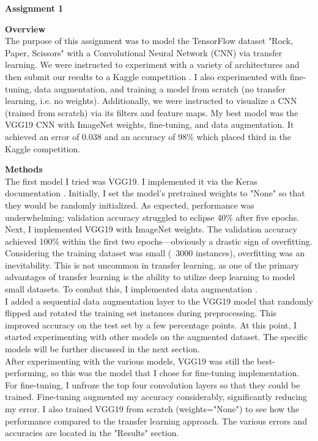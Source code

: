 \documentclass[12pt, letterpaper, onecolumn]{article}
\begin{document}
\begin{center}
\textbf{Assignment 1}
\end{center}

\noindent\textbf{Overview}\\
\indent The purpose of this assignment was to model the TensorFlow dataset "Rock, Paper, Scissors" \cite{rps} with a Convolutional Neural Network (CNN) via transfer learning. We were instructed to experiment with a variety of architectures and then submit our results to a Kaggle competition \cite{kaggle}. I also experimented with fine-tuning, data augmentation, and training a model from scratch (no transfer learning, i.e. no weights). Additionally, we were instructed to visualize a CNN (trained from scratch) via its filters and feature maps. My best model was the VGG19 \cite{vgg} CNN with ImageNet weights, fine-tuning, and data augmentation. It achieved an error of 0.038 and an accuracy of 98\% which placed third in the Kaggle competition. 

\vspace{0.125in}
\noindent\textbf{Methods}\\
\indent The first model I tried was VGG19. I implemented it via the Keras documentation \cite{keras}. Initially, I set the model's pretrained weights to "None" so that they would be randomly initialized. As expected, performance was underwhelming: validation accuracy struggled to eclipse 40\% after five epochs. Next, I implemented VGG19 with ImageNet weights. The validation accuracy achieved 100\% within the first two epochs—obviously a drastic sign of overfitting. Considering the training dataset was small (~3000 instances), overfitting was an inevitability. This is not uncommon in transfer learning, as one of the primary advantages of transfer learning is the ability to utilize deep learning to model small datasets. To combat this, I implemented data augmentation \cite{da}.\\
\indent I added a sequential data augmentation layer to the VGG19 model that randomly flipped and rotated the training set instances during preprocessing. This improved accuracy on the test set by a few percentage points. At this point, I started experimenting with other models on the augmented dataset. The specific models will be further discussed in the next section.\\
\indent After experimenting with the various models, VGG19 was still the best-performing, so this was the model that I chose for fine-tuning implementation. For fine-tuning, I unfroze the top four convolution layers so that they could be trained. Fine-tuning augmented my accuracy considerably, significantly reducing my error. I also trained VGG19 from scratch (weights="None") to see how the performance compared to the transfer learning approach. The various errors and accuracies are located in the "Results" section.
\end{document}
